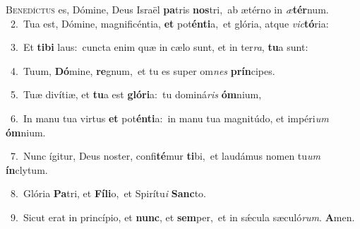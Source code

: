 \lettrine{\initial\textcolor{\initialcolor}{B}}{enedíctus} es, Dómine, Deus Israël \textbf{pa}\-tris \textbf{nos}\-tri,~\star ab ætérno in \textit{æ}\-\textbf{tér}num.\\
{\numbfont\textcolor{\numbcolor}{~2.}}~Tua est, Dómine, magnificéntia, \textbf{et} pot\-\textbf{én}\-\textbf{ti}a,~\star et glória, atque \textit{vic}\-\textbf{tó}ria:\par
{\numbfont\textcolor{\numbcolor}{~3.}}~Et \textbf{ti}\-\textbf{bi} laus:~\star cuncta enim quæ in cælo sunt, et in ter\-\textit{ra}\-, \textbf{tu}\-a sunt:\par
{\numbfont\textcolor{\numbcolor}{~4.}}~Tuum, \textbf{Dó}\-mine, \textbf{re}\-gnum,~\star et tu es super om\textit{nes} \textbf{prín}\-cipes.\par
{\numbfont\textcolor{\numbcolor}{~5.}}~Tuæ divítiæ, et \textbf{tu}\-a est \textbf{gló}\-\textbf{ri}a:~\star tu dominá\textit{ris} \textbf{óm}\-nium,\par
{\numbfont\textcolor{\numbcolor}{~6.}}~In manu tua virtus \textbf{et} pot\-\textbf{én}\-\textbf{ti}a:~\star in manu tua magnitúdo, et impéri\textit{um} \textbf{óm}\-nium.\par
{\numbfont\textcolor{\numbcolor}{~7.}}~Nunc ígitur, Deus noster, confi\-\textbf{té}\-mur \textbf{ti}\-bi,~\star et laudámus nomen tu\textit{um} \textbf{ín}\-clytum.\par
{\numbfont\textcolor{\numbcolor}{~8.}}~Glória \textbf{Pa}\-tri, et \textbf{Fí}\-\textbf{li}o,~\star et Spirítu\textit{i} \textbf{Sanc}\-to.\par
{\numbfont\textcolor{\numbcolor}{~9.}}~Sicut erat in princípio, et \textbf{nunc}\-, et \textbf{sem}\-per,~\star et in sǽcula sæculó\-\textit{rum}\-. \textbf{A}\-men.\par
